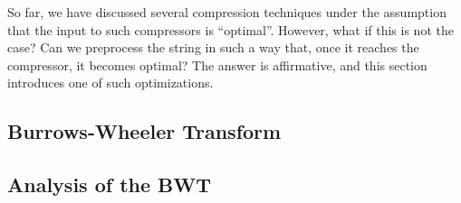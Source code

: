 \documentclass{subfiles}
\begin{document}
    So far, we have discussed several compression techniques under the assumption
    that the input to such compressors is ``optimal''\footnotemark. However, what
    if this is not the case? Can we preprocess the string in such a way that, once
    it reaches the compressor, it becomes optimal? The answer is affirmative, and
    this section introduces one of such optimizations.


    \subsection{Burrows-Wheeler Transform}
    

    \subsection{Analysis of the BWT}
    
\end{document}
